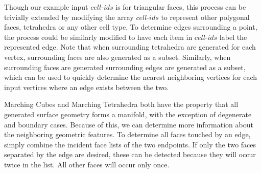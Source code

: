 \documentclass[10pt,journal,cspaper,compsoc]{IEEEtran}
\begin{document}

Though our example input $cell\mbox{-}ids$ is for triangular faces, this process can be trivially extended by modifying the array $cell\mbox{-}ids$ to represent other polygonal faces, tetrahedra or any other cell type. To determine edges surrounding a point, the process could be similarly modified to have each item in $cell\mbox{-}ids$ label the represented edge. Note that when surrounding tetrahedra are generated for each vertex, surrounding faces are also generated as a subset. Similarly, when surrounding faces are generated surrounding edges are generated as a subset, which can be used to quickly determine the nearest neighboring vertices for each input vertices where an edge exists between the two.

Marching Cubes and Marching Tetrahedra both have the property that all generated surface geometry forms a manifold, with the exception of degenerate and boundary cases. Because of this, we can determine more information about the neighboring geometric features. To determine all faces touched by an edge, simply combine the incident face lists of the two endpoints. If only the two faces separated by the edge are desired, these can be detected because they will occur twice in the list. All other faces will occur only once. 
\end{document}
